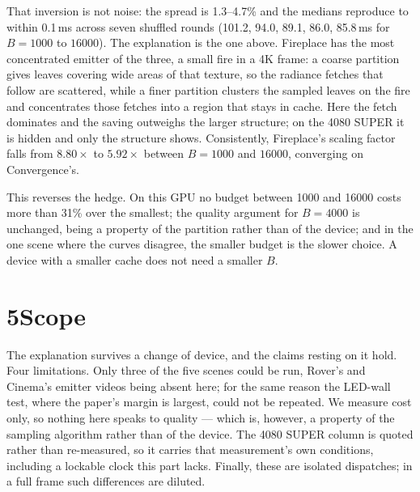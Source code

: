 \documentclass[10pt]{article}
\begin{document}
That inversion is not noise: the spread is 1.3--4.7\% and the medians reproduce to within 0.1\,ms
across seven shuffled rounds (101.2, 94.0, 89.1, 86.0, 85.8\,ms for $B=1000$ to $16000$). The
explanation is the one above. Fireplace has the most concentrated emitter of the three, a small fire
in a 4K frame: a coarse partition gives leaves covering wide areas of that texture, so the radiance
fetches that follow are scattered, while a finer partition clusters the sampled leaves on the fire
and concentrates those fetches into a region that stays in cache. Here the fetch dominates and the
saving outweighs the larger structure; on the 4080 SUPER it is hidden and only the structure shows.
Consistently, Fireplace's scaling factor falls from $8.80\times$ to $5.92\times$ between $B=1000$ and
$16000$, converging on Convergence's.

This reverses the hedge. On this GPU no budget between 1000 and 16000 costs more than 31\% over the
smallest; the quality argument for $B=4000$ is unchanged, being a property of the partition rather
than of the device; and in the one scene where the curves disagree, the smaller budget is the slower
choice. A device with a smaller cache does not need a smaller $B$.

\section*{5\quad Scope}

The explanation survives a change of device, and the claims resting on it hold. Four limitations.
Only three of the five scenes could be run, Rover's and Cinema's emitter videos being absent here;
for the same reason the LED-wall test, where the paper's margin is largest, could not be repeated. We
measure cost only, so nothing here speaks to quality --- which is, however, a property of the
sampling algorithm rather than of the device. The 4080 SUPER column is quoted rather than
re-measured, so it carries that measurement's own conditions, including a lockable clock this part
lacks. Finally, these are isolated dispatches; in a full frame such differences are diluted.
\end{document}
